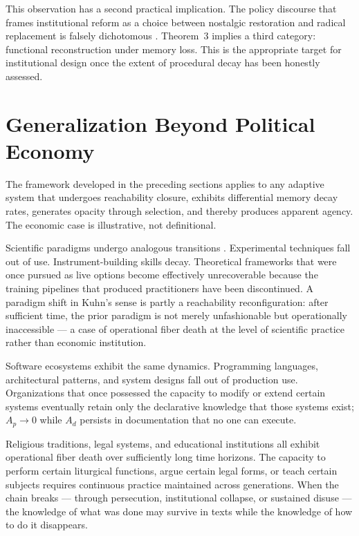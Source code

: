 \documentclass[12pt, a4paper]{article}
\theoremstyle{named}
\begin{document}
This observation has a second practical implication. The policy
discourse that frames institutional reform as a choice between
nostalgic restoration and radical replacement is falsely dichotomous
\cite{ostrom1990,page2018}. Theorem~3 implies a third category:
functional reconstruction under memory loss. This is the appropriate
target for institutional design once the extent of procedural decay has
been honestly assessed.

\section{Generalization Beyond Political Economy}

The framework developed in the preceding sections applies to any
adaptive system that undergoes reachability closure, exhibits
differential memory decay rates, generates opacity through selection,
and thereby produces apparent agency. The economic case is illustrative,
not definitional.

Scientific paradigms undergo analogous transitions \cite{kuhn1962}.
Experimental techniques fall out of use. Instrument-building skills
decay. Theoretical frameworks that were once pursued as live options
become effectively unrecoverable because the training pipelines that
produced practitioners have been discontinued. A paradigm shift in
Kuhn's sense \cite{kuhn1962} is partly a reachability reconfiguration:
after sufficient time, the prior paradigm is not merely unfashionable
but operationally inaccessible — a case of operational fiber death at
the level of scientific practice rather than economic institution.

Software ecosystems exhibit the same dynamics. Programming languages,
architectural patterns, and system designs fall out of production use.
Organizations that once possessed the capacity to modify or extend
certain systems eventually retain only the declarative knowledge that
those systems exist; $A_p \to 0$ while $A_d$ persists in documentation
that no one can execute.

Religious traditions, legal systems, and educational institutions all
exhibit operational fiber death over sufficiently long time horizons.
The capacity to perform certain liturgical functions, argue certain
legal forms, or teach certain subjects requires continuous practice
maintained across generations. When the chain breaks — through
persecution, institutional collapse, or sustained disuse — the
knowledge of what was done may survive in texts while the knowledge of
how to do it disappears.
\end{document}
